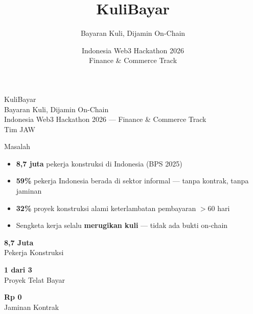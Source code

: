 \documentclass[aspectratio=169,14pt]{beamer}
\title{KuliBayar}
\subtitle{\textcolor{korange}{Bayaran Kuli, Dijamin On-Chain}}
\date{Indonesia Web3 Hackathon 2026 \\ \vspace{0.3em} \textcolor{kmuted}{\small Finance \& Commerce Track}}
\newcommand{\highlight}[1]{\textcolor{korange}{\textbf{#1}}}
\newcommand{\stat}[2]{\begin{minipage}{0.3\textwidth}\centering\textcolor{korange}{\Huge\bfseries#1}\\\textcolor{kmuted}{\small #2}\end{minipage}}
\begin{document}
\begin{frame}[plain]
\vfill
\begin{center}
  {\fontsize{48}{56}\selectfont\textcolor{kwhite}{KuliBayar}}\\[0.3em]
  {\fontsize{18}{24}\selectfont\textcolor{korange}{Bayaran Kuli, Dijamin On-Chain}}\\[2em]
  {\small\textcolor{kmuted}{Indonesia Web3 Hackathon 2026 — Finance \& Commerce Track}}\\[0.5em]
  {\small\textcolor{kmuted}{Tim JAW}}
\end{center}
\vfill
\end{frame}

\begin{frame}{Masalah}
\begin{itemize}
  \item \highlight{8,7 juta} pekerja konstruksi di Indonesia (BPS 2025)
  \item \highlight{59\%} pekerja Indonesia berada di sektor informal — tanpa kontrak, tanpa jaminan
  \item \highlight{32\%} proyek konstruksi alami keterlambatan pembayaran $>$60 hari
  \item Sengketa kerja selalu \highlight{merugikan kuli} — tidak ada bukti on-chain
\end{itemize}

\vspace{0.8em}
\begin{center}
\stat{8,7 Juta}{Pekerja Konstruksi} \hfill \stat{1 dari 3}{Proyek Telat Bayar} \hfill \stat{Rp 0}{Jaminan Kontrak}
\end{center}
\end{frame}
\end{document}
